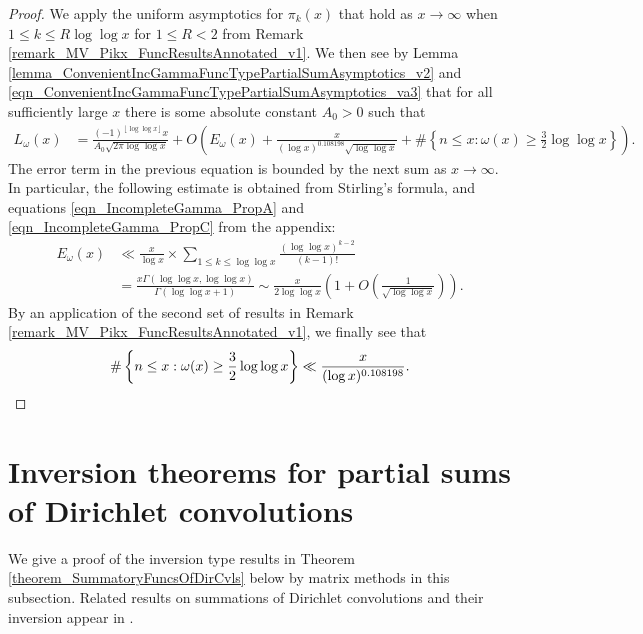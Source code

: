 \documentclass[11pt,reqno,a4letter]{article}
\newcommand{\hlocalref}[1]{\hyperref[#1]{\ref{#1}}}
\numberwithin{equation}{section}
\numberwithin{figure}{section}
\numberwithin{table}{section}
\newcommand{\cf}{\textit{cf.\ }}
\newcommand{\floor}[1]{\left\lfloor #1 \right\rfloor}
\theoremstyle{plain}
\numberwithin{theorem}{section}
\theoremstyle{definition}
\begin{document}
\begin{proof}
We apply the uniform asymptotics for $\pi_k(x)$ that hold as $x \rightarrow \infty$ when 
$1 \leq k \leq R \log\log x$ for $1 \leq R < 2$ from 
Remark \hlocalref{remark_MV_Pikx_FuncResultsAnnotated_v1}. We then see 
by Lemma \hlocalref{lemma_ConvenientIncGammaFuncTypePartialSumAsymptotics_v2} 
and \eqref{eqn_ConvenientIncGammaFuncTypePartialSumAsymptotics_va3} 
that for all sufficiently large $x$ 
there is some absolute constant $A_0 > 0$ such that 
\begin{align*}
L_{\omega}(x) & = \frac{(-1)^{\floor{\log\log x}} x}{A_0 \sqrt{2\pi \log\log x}} + 
     O\left(E_{\omega}(x) + 
     \frac{x}{(\log x)^{0.108198} \sqrt{\log\log x}} + 
     \#\left\{n \leq x: \omega(x) \geq \frac{3}{2}\log\log x\right\}\right). 
\end{align*} 
The error term in the previous equation 
is bounded by the next sum as $x \rightarrow \infty$. 
In particular, the following estimate is obtained from Stirling's formula, and 
equations \eqref{eqn_IncompleteGamma_PropA} and 
\eqref{eqn_IncompleteGamma_PropC} from the appendix: 
\begin{align*} 
E_{\omega}(x) & \ll \frac{x}{\log x} \times 
     \sum_{1 \leq k \leq \log\log x} \frac{(\log\log x)^{k-2}}{(k-1)!} \\ 
     & = 
     \frac{x \Gamma(\log\log x, \log\log x)}{\Gamma(\log\log x + 1)} 
     \sim \frac{x}{2\log\log x} \left(1 + O\left(\frac{1}{\sqrt{\log\log x}}\right)\right). 
\end{align*}
By an application of the second set of results in 
Remark \hlocalref{remark_MV_Pikx_FuncResultsAnnotated_v1}, we finally see that 
\[
\#\left\{n \leq x: \omega(x) \geq \frac{3}{2}\log\log x\right\} \ll 
     \frac{x}{(\log x)^{0.108198}}. 
     \qedhere 
\] 
\end{proof}

\section{Inversion theorems for partial sums of Dirichlet convolutions}
\label{Section_PrelimProofs_Config} 
\label{subSection_PrelimProofs_Config_InversionTheorem}

We give a proof of the inversion type results in 
Theorem \hlocalref{theorem_SummatoryFuncsOfDirCvls} 
below by matrix methods in this subsection. 
Related results on summations of Dirichlet convolutions and their inversion appear in 
\cite[\S 2.14; \S 3.10; \S 3.12; \cf \S 4.9, p.\ 95]{APOSTOLANUMT}. 
\end{document}
